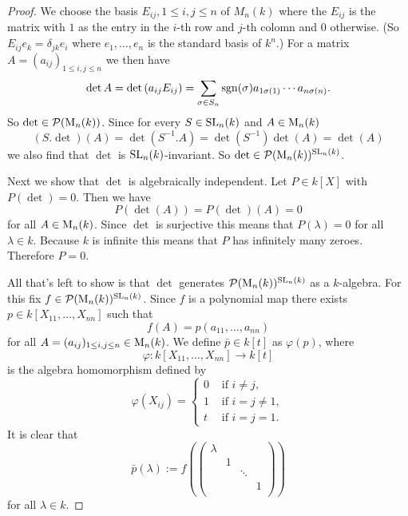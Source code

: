 \begin{proof}
 We choose the basis $E_{ij}, 1 \leq i,j \leq n$ of $M_n(k)$ where the $E_{ij}$ is the matrix with $1$ as the entry in the $i$-th row and $j$-th colomn and $0$ otherwise. (So $E_{ij} e_k = \delta_{jk}e_i$ where $e_1, \dotsc, e_n$ is the standard basis of $k^n$.)  For a matrix $A = (a_{ij})_{1 \leq i,j \leq n}$ we then have
 \[
  \det A
  = \det\left( a_{ij} E_{ij}\right)
  = \sum_{\sigma \in S_n} \operatorname{sgn}(\sigma) a_{1 \sigma(1)} \dotsm a_{n \sigma(n)}.
 \]
 So $\det \in \mathcal{P}(\operatorname{M}_n(k))$. Since for every $S \in \operatorname{SL}_n(k)$ and $A \in \operatorname{M}_n(k)$
 \[
  (S.\det)(A) = \det\left(S^{-1}.A\right) = \det\left(S^{-1}\right) \det(A) = \det(A)
 \]
 we also find that $\det$ is $\operatorname{SL}_n(k)$-invariant. So $\det \in \mathcal{P}(\operatorname{M}_n(k))^{\operatorname{SL}_n(k)}$.
 
 Next we show that $\det$ is algebraically independent. Let $P \in k[X]$ with $P(\det) = 0$. Then we have
 \[
  P(\det(A)) = P(\det)(A) = 0
 \]
 for all $A \in \operatorname{M}_n(k)$. Since $\det$ is surjective this means that $P(\lambda) = 0$ for all $\lambda \in k$. Because $k$ is infinite this means that $P$ has infinitely many zeroes. Therefore $P = 0$.
 
 All that’s left to show is that $\det$ generates $\mathcal{P}(\operatorname{M}_n(k))^{\operatorname{SL}_n(k)}$ as a $k$-algebra. For this fix $f \in \mathcal{P}(\operatorname{M}_n(k))^{\operatorname{SL}_n(k)}$. Since $f$ is a polynomial map there exists $p \in k[X_{11}, \dotsc, X_{nn}]$ such that
 \[
  f(A) = p(a_{11}, \dotsc, a_{nn})
 \]
 for all $A = (a_{ij})_{1 \leq i,j \leq n} \in \operatorname{M}_n(k)$. We define $\bar{p} \in k[t]$ as $\varphi(p)$, where
 \[
  \varphi \colon k[X_{11}, \dotsc, X_{nn}] \to k[t]
 \] 
 is the algebra homomorphism defined by 
 \[
  \varphi(X_{ij}) =
  \begin{cases}
   0 & \text{ if } i \neq j, \\
   1 & \text{ if } i = j \neq 1, \\
   t & \text{ if } i = j = 1.
  \end{cases}
 \]
 It is clear that
 \[
  \bar{p}(\lambda) :=
  f\left(
   \begin{pmatrix}
    \lambda &   &        &   \\
            & 1 &        &   \\
            &   & \ddots &   \\
            &   &        & 1 \\
   \end{pmatrix}
  \right)
 \]
 for all $\lambda \in k$.
 

\end{proof}
